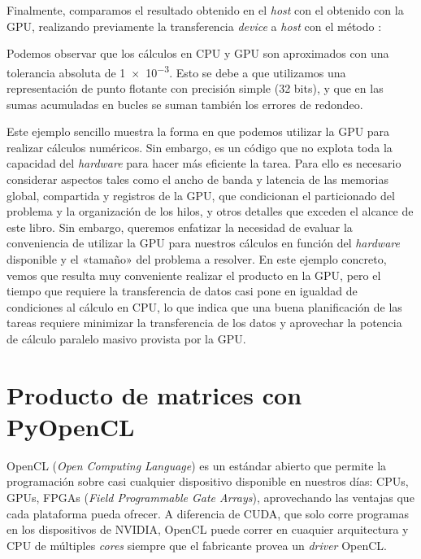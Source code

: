 Finalmente, comparamos el resultado obtenido en el \textit{host} con el obtenido con la GPU, realizando previamente la transferencia \textit{device} a \textit{host} con el método :


Podemos observar que los cálculos en CPU y GPU son aproximados con una tolerancia absoluta de \num{1e-3}. Esto se debe a que utilizamos una representación de punto flotante con precisión simple (32 bits), y que en las sumas acumuladas en bucles se suman también los errores de redondeo.

Este ejemplo sencillo muestra la forma en que podemos utilizar la GPU para realizar cálculos numéricos. Sin embargo, es un código que no explota toda la capacidad del \textit{hardware} para hacer más eficiente la tarea. Para ello es necesario considerar aspectos tales como el ancho de banda y latencia de las memorias global, compartida y registros de la GPU, que condicionan el particionado del problema y la organización de los hilos, y otros detalles que exceden el alcance de este libro. Sin embargo, queremos enfatizar la necesidad de evaluar la conveniencia de utilizar la GPU para nuestros cálculos en función del \textit{hardware} disponible y el «tamaño» del problema a resolver. En este ejemplo concreto, vemos que resulta muy conveniente realizar el producto en la GPU, pero el tiempo que requiere la transferencia de datos casi pone en igualdad de condiciones al cálculo en CPU, lo que indica que una buena planificación de las tareas requiere minimizar la transferencia de los datos y aprovechar la potencia de cálculo paralelo masivo provista por la GPU.

\section{Producto de matrices con PyOpenCL}

OpenCL (\textit{Open Computing Language}) es un estándar abierto que permite la programación sobre casi cualquier dispositivo disponible en nuestros días: CPUs, GPUs, FPGAs (\textit{Field Programmable Gate Arrays}), aprovechando las ventajas que cada plataforma pueda ofrecer. A diferencia de CUDA, que solo corre programas en los dispositivos de NVIDIA, OpenCL puede correr en cuaquier arquitectura y CPU de múltiples \textit{cores} siempre que el fabricante provea un \textit{driver} OpenCL.


